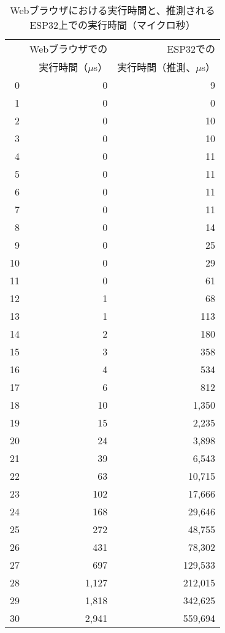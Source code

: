 \begin{table}[htbp]
  \caption{Webブラウザにおける実行時間と、推測されるESP32上での実行時間（マイクロ秒）}
  \label{tab:fib_time_browser}
  \begin{center}
    \begin{tabular}{rrr}
      \hline
      & Webブラウザでの & ESP32での \\
      & 実行時間（$\mu$s） & 実行時間（推測、$\mu$s） \\ \hline \hline
       0 &     0 &       9 \\ \hline
       1 &     0 &       0 \\ \hline
       2 &     0 &      10 \\ \hline
       3 &     0 &      10 \\ \hline
       4 &     0 &      11 \\ \hline
       5 &     0 &      11 \\ \hline
       6 &     0 &      11 \\ \hline
       7 &     0 &      11 \\ \hline
       8 &     0 &      14 \\ \hline
       9 &     0 &      25 \\ \hline
      10 &     0 &      29 \\ \hline
      11 &     0 &      61 \\ \hline
      12 &     1 &      68 \\ \hline
      13 &     1 &     113 \\ \hline
      14 &     2 &     180 \\ \hline
      15 &     3 &     358 \\ \hline
      16 &     4 &     534 \\ \hline
      17 &     6 &     812 \\ \hline
      18 &    10 &   1,350 \\ \hline
      19 &    15 &   2,235 \\ \hline
      20 &    24 &   3,898 \\ \hline
      21 &    39 &   6,543 \\ \hline
      22 &    63 &  10,715 \\ \hline
      23 &   102 &  17,666 \\ \hline
      24 &   168 &  29,646 \\ \hline
      25 &   272 &  48,755 \\ \hline
      26 &   431 &  78,302 \\ \hline
      27 &   697 & 129,533 \\ \hline
      28 & 1,127 & 212,015 \\ \hline
      29 & 1,818 & 342,625 \\ \hline
      30 & 2,941 & 559,694 \\ \hline
    \end{tabular}
  \end{center}
\end{table}


